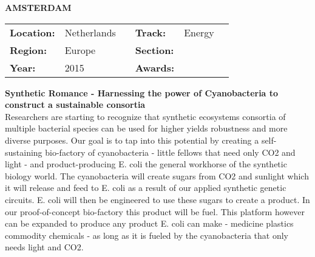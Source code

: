 \textbf{\uppercase{Amsterdam}} \FloatBarrier \begin{table}[h] \begin{tabular}{lp{2.5cm}llll} \textbf{Location:} & Netherlands & \multicolumn{1}{|l}{} & \textbf{Track:}   & Energy \\ \textbf{Region:}   & Europe   & \multicolumn{1}{|l}{} & \textbf{Section:} &  \\ \textbf{Year:}     & 2015   & \multicolumn{1}{|l}{} & \textbf{Awards:}  & \end{tabular} \end{table} \FloatBarrier \noindent\textbf{Synthetic Romance - Harnessing the power of Cyanobacteria to construct a sustainable consortia} \vspace{.2cm}\\  Researchers are starting to recognize that synthetic ecosystems consortia of multiple bacterial species can be used for higher yields robustness and more diverse purposes. Our goal is to tap into this potential by creating a self-sustaining bio-factory of cyanobacteria - little fellows that need only CO2 and light - and product-producing E. coli the general workhorse of the synthetic biology world. The cyanobacteria will create sugars from CO2 and sunlight which it will release and feed to E. coli as a result of our applied synthetic genetic circuits. E. coli will then be engineered to use these sugars to create a product. In our proof-of-concept bio-factory this product will be fuel. This platform however can be expanded to produce any product E. coli can make - medicine plastics commodity chemicals - as long as it is fueled by the cyanobacteria that only needs light and CO2.
\vspace{2cm}

